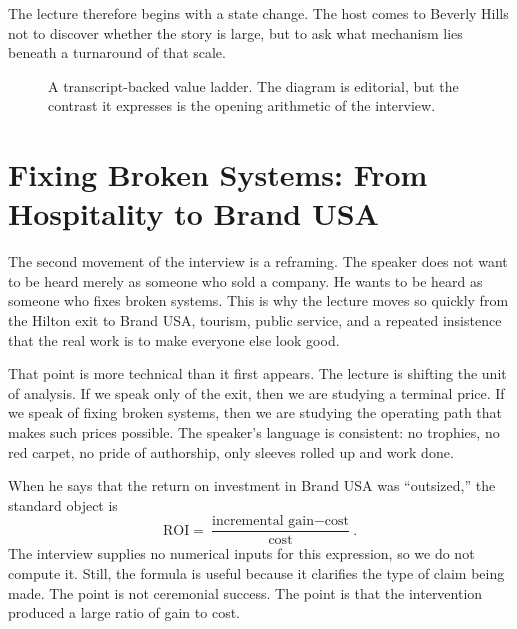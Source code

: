 The lecture therefore begins with a state change. The host comes to Beverly Hills not to discover whether the story is large, but to ask what mechanism lies beneath a turnaround of that scale.

\begin{figure}[h]
\centering
{}
\caption{A transcript-backed value ladder. The diagram is editorial, but the contrast it expresses is the opening arithmetic of the interview.}
\end{figure}

\section{Fixing Broken Systems: From Hospitality to Brand USA}

The second movement of the interview is a reframing. The speaker does not want to be heard merely as someone who sold a company. He wants to be heard as someone who fixes broken systems. This is why the lecture moves so quickly from the Hilton exit to Brand USA, tourism, public service, and a repeated insistence that the real work is to make everyone else look good.

That point is more technical than it first appears. The lecture is shifting the unit of analysis. If we speak only of the exit, then we are studying a terminal price. If we speak of fixing broken systems, then we are studying the operating path that makes such prices possible. The speaker's language is consistent: no trophies, no red carpet, no pride of authorship, only sleeves rolled up and work done.

When he says that the return on investment in Brand USA was ``outsized,'' the standard object is
\begin{equation}
\mathrm{ROI}=\frac{\text{incremental gain}-\text{cost}}{\text{cost}}.
\end{equation}
The interview supplies no numerical inputs for this expression, so we do not compute it. Still, the formula is useful because it clarifies the type of claim being made. The point is not ceremonial success. The point is that the intervention produced a large ratio of gain to cost.

